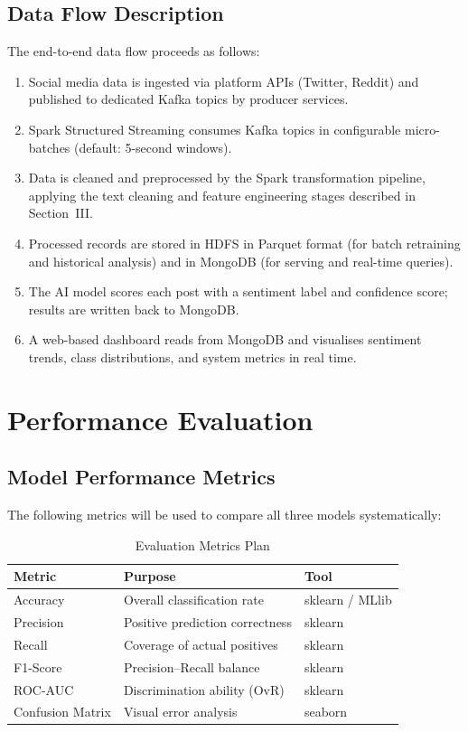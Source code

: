 \documentclass[conference]{IEEEtran}
\begin{document}
\subsection{Data Flow Description}
The end-to-end data flow proceeds as follows:
\begin{enumerate}[leftmargin=*]
    \item Social media data is ingested via platform APIs (Twitter, Reddit) and published to dedicated Kafka topics by producer services.
    \item Spark Structured Streaming consumes Kafka topics in configurable micro-batches (default: 5-second windows).
    \item Data is cleaned and preprocessed by the Spark transformation pipeline, applying the text cleaning and feature engineering stages described in Section~III.
    \item Processed records are stored in HDFS in Parquet format (for batch retraining and historical analysis) and in MongoDB (for serving and real-time queries).
    \item The AI model scores each post with a sentiment label and confidence score; results are written back to MongoDB.
    \item A web-based dashboard reads from MongoDB and visualises sentiment trends, class distributions, and system metrics in real time.
\end{enumerate}

\section{Performance Evaluation}

\subsection{Model Performance Metrics}
The following metrics will be used to compare all three models systematically:

\begin{table}[H]
\centering
\caption{Evaluation Metrics Plan}
\label{tab:metrics}
\renewcommand{\arraystretch}{1.15}
\begin{tabular}{@{}lll@{}}
\toprule
\textbf{Metric} & \textbf{Purpose} & \textbf{Tool} \\
\midrule
Accuracy & Overall classification rate & sklearn / MLlib \\
Precision & Positive prediction correctness & sklearn \\
Recall & Coverage of actual positives & sklearn \\
F1-Score & Precision--Recall balance & sklearn \\
ROC-AUC & Discrimination ability (OvR) & sklearn \\
Confusion Matrix & Visual error analysis & seaborn \\
\bottomrule
\end{tabular}
\end{table}
\end{document}
